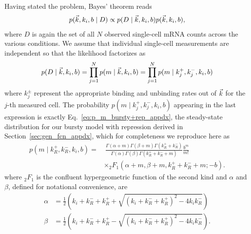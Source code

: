 Having stated the problem, Bayes' theorem reads
\begin{equation}
p(\vec{k}, k_i, b \mid D)
\propto
p(D \mid\vec{k}, k_i, b) p(\vec{k}, k_i, b),
\end{equation}
where $D$ is again the set of all $N$ observed single-cell mRNA counts
across the various conditions. We assume that individual single-cell
measurements are independent so that the likelihood factorizes as
\begin{equation}
p(D \mid\vec{k}, k_i, b)
= \prod_{j=1}^N p(m\mid \vec{k}, k_i, b)
= \prod_{j=1}^N p(m\mid k_j^+, k_j^-, k_i, b)
\end{equation}
where $k_j^\pm$ represent the appropriate binding and unbinding
rates out of $\vec{k}$ for the $j$-th measured cell. The probability
$p(m\mid k_j^+, k_j^-, k_i, b)$ appearing in the last expression
is exactly Eq.~\ref{eq:p_m_bursty+rep_appdx}, the steady-state
distribution for our bursty model with repression derived in
Section~\ref{sec:gen_fcn_appdx}, which for completeness we reproduce here as
\begin{equation}
\begin{split}
p(m \mid k_R^+, k_R^-, k_i, b) = & ~\frac{
        \Gamma(\alpha + m)\Gamma(\beta + m)\Gamma(k_R^+ + k_R^-)
        }
        {
        \Gamma(\alpha)\Gamma(\beta)\Gamma(k_R^+ + k_R^- + m)
        }
\frac{b^m}{m!}
\\
&\times {_2F_1}(\alpha+m, \beta+m, k_R^++k_R^-+m; -b).
\end{split}
\label{eq:p_m_bursty+rep}
\end{equation}
where $_2F_1$ is the confluent hypergeometric function of the second kind and
$\alpha$ and $\beta$, defined for notational convenience, are
\begin{equation}
\begin{split}
\alpha &= \frac{1}{2}
\left(k_i+k_R^-+k_R^+ + \sqrt{(k_i+k_R^-+k_R^+)^2 - 4k_i k_R^-}\right)
\\
\beta &= \frac{1}{2}
\left(k_i+k_R^-+k_R^+ - \sqrt{(k_i+k_R^-+k_R^+)^2 - 4k_i k_R^-}\right).
\end{split}
\end{equation}

